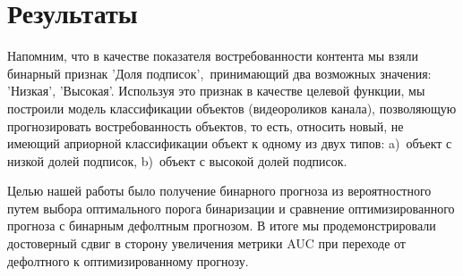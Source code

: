 \section{Результаты}
	
	Напомним, что в качестве показателя востребованности контента мы взяли бинарный признак 'Доля подписок', принимающий два возможных значения: 'Низкая', 'Высокая'. Используя это признак в качестве целевой функции, мы построили модель классификации объектов (видеороликов канала), позволяющую прогнозировать востребованность объектов, то есть, относить новый, не имеющий априорной классификации объект к одному из двух типов: a)~объект с низкой долей подписок, b)~объект с высокой долей подписок. 
	
	Целью нашей работы было получение бинарного прогноза из вероятностного путем выбора оптимального порога бинаризации и сравнение оптимизированного прогноза с бинарным дефолтным прогнозом. В итоге мы продемонстрировали достоверный сдвиг в сторону увеличения метрики AUC при переходе от дефолтного к оптимизированному прогнозу.